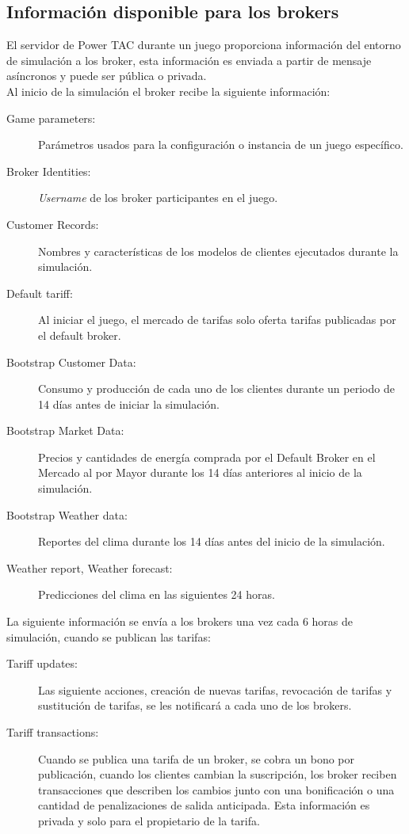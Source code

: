 \subsection{Información disponible para los brokers}

El servidor de Power TAC durante un juego proporciona información del entorno de simulación a los broker, esta información es enviada a partir de mensaje  asíncronos y puede ser pública o privada.\\

Al inicio de la simulación el broker recibe la siguiente información:
\begin{description}
	\item [Game parameters: ]Parámetros usados para la configuración o instancia de un juego específico.    
	\item [Broker Identities: ]\textit{Username} de los broker participantes en el juego.
	\item [Customer Records: ]Nombres y características de los modelos de clientes ejecutados durante la simulación.
	\item [Default tariff: ]Al iniciar el juego, el mercado de tarifas solo oferta tarifas publicadas por el default broker.
	\item [Bootstrap Customer Data: ]Consumo y producción de cada uno de los clientes durante un periodo de 14 días antes de iniciar la simulación.
	\item [Bootstrap Market Data: ]Precios y cantidades de energía comprada por el Default Broker en el Mercado al por Mayor durante los 14 días anteriores al inicio de la simulación.
	\item [Bootstrap Weather data: ]Reportes del clima durante los 14 días antes del inicio de la simulación.
	\item [Weather report, Weather forecast: ]Predicciones del clima en las siguientes 24 horas.  
\end{description}
La siguiente información se envía a los brokers una vez cada 6 horas de simulación, cuando se publican las tarifas:
\begin{description}
	\item [Tariff updates: ]Las siguiente acciones, creación de nuevas tarifas, revocación de tarifas y sustitución de tarifas, se les notificará a cada uno de los brokers.
	\item [Tariff transactions:] Cuando se publica una tarifa de un broker, se  cobra un bono por publicación, cuando los clientes  cambian la suscripción, los broker reciben transacciones que describen los cambios junto con una bonificación o una cantidad de penalizaciones de salida anticipada. Esta información es privada y solo para el propietario de la tarifa.
\end{description}
